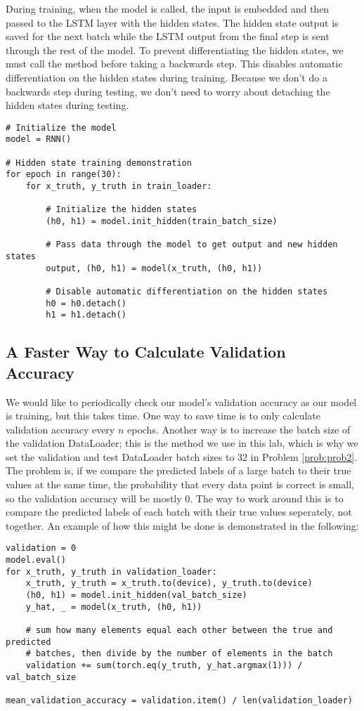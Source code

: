 During training, when the model is called, the input is embedded and then passed to the LSTM layer with the hidden states.
The hidden state output is saved for the next batch while the LSTM output from the final step is sent through the rest of the model.
To prevent differentiating the hidden states, we must call the  method before taking a backwards step.
This disables automatic differentiation on the hidden states during training.
Because we don't do a backwards step during testing, we don't need to worry about detaching the hidden states during testing.

\begin{lstlisting}
# Initialize the model  
model = RNN()   

# Hidden state training demonstration
for epoch in range(30):
    for x_truth, y_truth in train_loader:

        # Initialize the hidden states
        (h0, h1) = model.init_hidden(train_batch_size)

        # Pass data through the model to get output and new hidden states
        output, (h0, h1) = model(x_truth, (h0, h1))

        # Disable automatic differentiation on the hidden states
        h0 = h0.detach()
        h1 = h1.detach()

\end{lstlisting}

\subsection*{A Faster Way to Calculate Validation Accuracy}
We would like to periodically check our model's validation accuracy as our model is training, but this takes time.
One way to save time is to only calculate validation accuracy every $n$ epochs.
Another way is to increase the batch size of the validation DataLoader; this is the method we use in this lab, which is why we set the validation and test DataLoader batch sizes to 32 in Problem \ref{prob:prob2}.
The problem is, if we compare the predicted labels of a large batch to their true values at the same time, the probability that every data point is correct is small, so the validation accuracy will be mostly 0.
The way to work around this is to compare the predicted labels of each batch with their true values seperately, not together.
An example of how this might be done is demonstrated in the following:

\begin{lstlisting}
validation = 0
model.eval()
for x_truth, y_truth in validation_loader:
    x_truth, y_truth = x_truth.to(device), y_truth.to(device)
    (h0, h1) = model.init_hidden(val_batch_size)
    y_hat, _ = model(x_truth, (h0, h1))

    # sum how many elements equal each other between the true and predicted
    # batches, then divide by the number of elements in the batch
    validation += sum(torch.eq(y_truth, y_hat.argmax(1))) / val_batch_size

mean_validation_accuracy = validation.item() / len(validation_loader)

\end{lstlisting}

